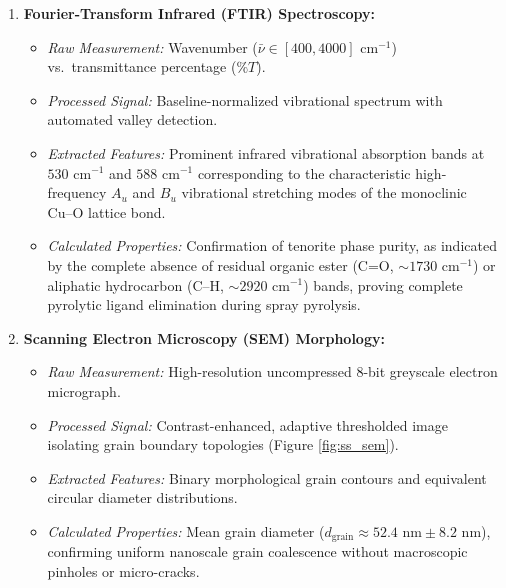 \documentclass[12pt,a4paper,oneside]{report}
\begin{document}
{{{\begin{enumerate}
    \item \textbf{Fourier-Transform Infrared (FTIR) Spectroscopy:}
    \begin{itemize}
        \item \textit{Raw Measurement:} Wavenumber ($\bar{\nu} \in [400, 4000]\text{ cm}^{-1}$) vs.\ transmittance percentage ($\%T$).
        \item \textit{Processed Signal:} Baseline-normalized vibrational spectrum with automated valley detection.
        \item \textit{Extracted Features:} Prominent infrared vibrational absorption bands at $530\text{ cm}^{-1}$ and $588\text{ cm}^{-1}$ corresponding to the characteristic high-frequency $A_u$ and $B_u$ vibrational stretching modes of the monoclinic $\text{Cu--O}$ lattice bond.
        \item \textit{Calculated Properties:} Confirmation of tenorite phase purity, as indicated by the complete absence of residual organic ester ($\text{C=O}$, $\sim 1730\text{ cm}^{-1}$) or aliphatic hydrocarbon ($\text{C--H}$, $\sim 2920\text{ cm}^{-1}$) bands, proving complete pyrolytic ligand elimination during spray pyrolysis.
    \end{itemize}

    \item \textbf{Scanning Electron Microscopy (SEM) Morphology:}
    \begin{itemize}
        \item \textit{Raw Measurement:} High-resolution uncompressed 8-bit greyscale electron micrograph.
        \item \textit{Processed Signal:} Contrast-enhanced, adaptive thresholded image isolating grain boundary topologies (Figure \ref{fig:ss_sem}).
        \item \textit{Extracted Features:} Binary morphological grain contours and equivalent circular diameter distributions.
        \item \textit{Calculated Properties:} Mean grain diameter ($d_{\text{grain}} \approx 52.4\text{ nm} \pm 8.2\text{ nm}$), confirming uniform nanoscale grain coalescence without macroscopic pinholes or micro-cracks.
    \end{itemize}


\end{enumerate}}}}
\end{document}

